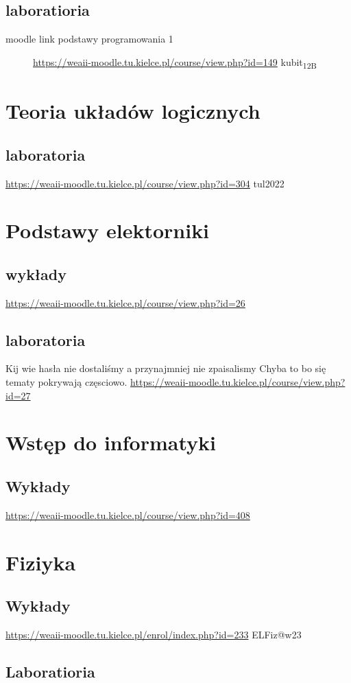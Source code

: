 \documentclass[11pt]{article}
\begin{document}
\subsection{laboratioria}
\label{sec:orga92f9d7}
\begin{description}
\item[{moodle link podstawy programowania 1}] \url{https://weaii-moodle.tu.kielce.pl/course/view.php?id=149} kubit\textsubscript{12B}
\end{description}
\section{Teoria układów logicznych}
\label{sec:orgeb44bfd}
\subsection{laboratoria}
\label{sec:org3b17d49}
\url{https://weaii-moodle.tu.kielce.pl/course/view.php?id=304} tul2022
\section{Podstawy elektorniki}
\label{sec:orge3d6c99}
\subsection{wykłady}
\label{sec:orga127d10}
\url{https://weaii-moodle.tu.kielce.pl/course/view.php?id=26}
\subsection{laboratoria}
\label{sec:orgb069ac7}
Kij wie hasła nie dostaliśmy a przynajmniej nie zpaisalismy
Chyba to bo się tematy pokrywają częsciowo.
\url{https://weaii-moodle.tu.kielce.pl/course/view.php?id=27}
\section{Wstęp do informatyki}
\label{sec:org999fd0b}
\subsection{Wykłady}
\label{sec:org2f8e364}
\url{https://weaii-moodle.tu.kielce.pl/course/view.php?id=408}
\section{Fiziyka}
\label{sec:orgf9c9b28}
\subsection{Wykłady}
\label{sec:orgee47f94}
\url{https://weaii-moodle.tu.kielce.pl/enrol/index.php?id=233} ELFiz@w23
\subsection{Laboratioria}
\label{sec:orgf3e2ab5}
\end{document}
